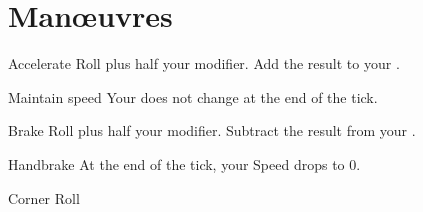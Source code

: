 
\section{Man\oe{}uvres}

\begin{describe}{Accelerate}
  Roll  plus half your  modifier. Add the result to your .
\end{describe}

\begin{describe}{Maintain speed}
  Your  does not change at the end of the tick.
\end{describe}

\begin{describe}{Brake}
  Roll  plus half your  modifier. Subtract the result from your .
\end{describe}

\begin{describe}{Handbrake}
  At the end of the tick, your Speed drops to 0.
\end{describe}

\begin{describe}{Corner}
  Roll 
\end{describe}
